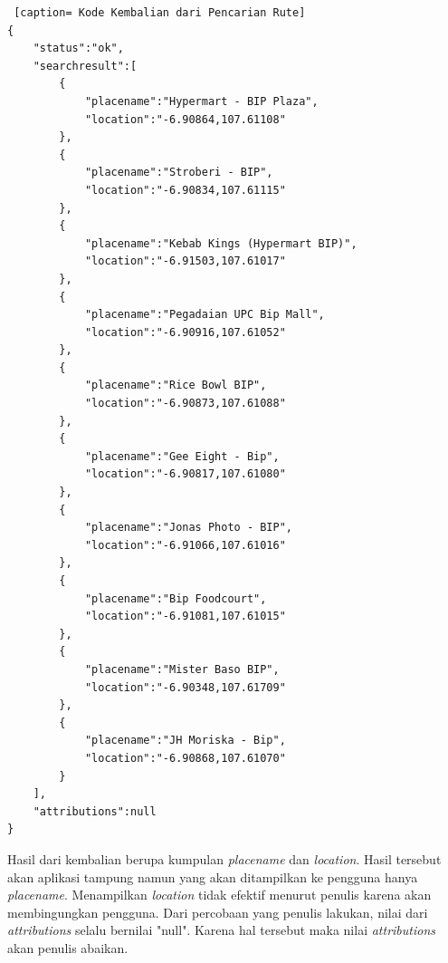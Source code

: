 \begin{lstlisting} [caption= Kode Kembalian dari Pencarian Rute]
{ 
	"status":"ok",
	"searchresult":[
		{
			"placename":"Hypermart - BIP Plaza",
			"location":"-6.90864,107.61108"
		},
		{
			"placename":"Stroberi - BIP",
			"location":"-6.90834,107.61115"
		},
		{
			"placename":"Kebab Kings (Hypermart BIP)",
			"location":"-6.91503,107.61017"
		},
		{
			"placename":"Pegadaian UPC Bip Mall",
			"location":"-6.90916,107.61052"
		},
		{
			"placename":"Rice Bowl BIP",
			"location":"-6.90873,107.61088"
		},
		{	
			"placename":"Gee Eight - Bip",
			"location":"-6.90817,107.61080"
		},
		{
			"placename":"Jonas Photo - BIP",
			"location":"-6.91066,107.61016"
		},
		{
			"placename":"Bip Foodcourt",
			"location":"-6.91081,107.61015"
		},
		{
			"placename":"Mister Baso BIP",
			"location":"-6.90348,107.61709"
		},
		{
			"placename":"JH Moriska - Bip",
			"location":"-6.90868,107.61070"
		}
	],
	"attributions":null
}
\end{lstlisting}

Hasil dari kembalian berupa kumpulan \textit{placename} dan \textit{location}. Hasil tersebut akan aplikasi tampung namun yang akan ditampilkan ke pengguna hanya \textit{placename}. Menampilkan \textit{location} tidak efektif menurut penulis karena akan membingungkan pengguna. Dari percobaan yang penulis lakukan, nilai dari \textit{attributions} selalu bernilai "null". Karena hal tersebut maka nilai \textit{attributions} akan penulis abaikan.

